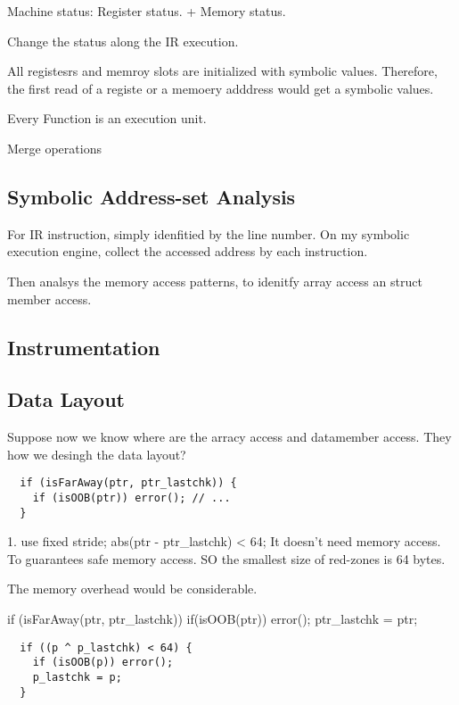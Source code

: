 Machine status: Register status. + Memory status.

Change the status along the IR execution.

All registesrs and memroy slots are initialized with symbolic values.
Therefore, the first read of a registe or a memoery adddress would get a symbolic values.

Every Function is an execution unit.

Merge operations





\subsection{Symbolic Address-set Analysis}
For IR instruction, simply idenfitied by the line number.
On my symbolic execution engine, collect the accessed address by each instruction.

Then analsys the memory access patterns, to
idenitfy array access an struct member access.




\subsection{Instrumentation}

\subsection{Data Layout}



Suppose now we know where are the arracy access and datamember access.
They how we desingh the data layout?


\begin{verbatim}
  if (isFarAway(ptr, ptr_lastchk)) {
    if (isOOB(ptr)) error(); // ...
  }
\end{verbatim}

1. use fixed stride;
abs(ptr - ptr_lastchk) < 64;
It doesn't need memory access.
To guarantees safe memory access. SO the smallest size of red-zones is 64 bytes.

The memory overhead would be considerable.


if (isFarAway(ptr, ptr_lastchk)) {
    if(isOOB(ptr)) error();
    ptr_lastchk = ptr;
  }

\begin{verbatim}
  if ((p ^ p_lastchk) < 64) {
    if (isOOB(p)) error();
    p_lastchk = p;
  }
\end{verbatim}


